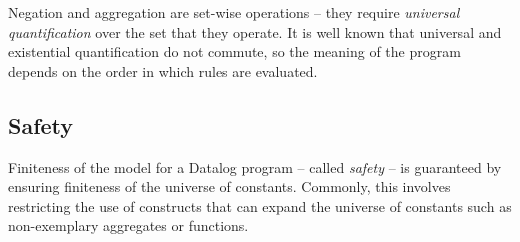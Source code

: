 

Negation and aggregation are set-wise operations -- they require {\em universal
quantification} over the set that they operate.  It is well known that universal
and existential quantification do not commute, so the meaning of the program
depends on the order in which rules are evaluated.

\subsection{Safety}

Finiteness of the model for a Datalog program -- called {\em safety} -- is
guaranteed by ensuring finiteness of the universe of constants.  Commonly, this
involves restricting the use of constructs that can expand the universe of
constants such as non-exemplary aggregates or functions.



